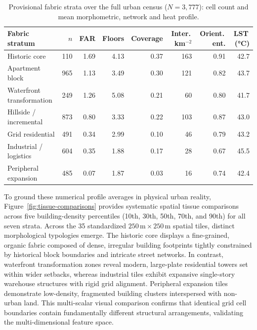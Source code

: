 \begin{table}[htbp]
  \centering\footnotesize
  \caption{Provisional fabric strata over the full urban census ($N=3{,}777$): cell
  count and mean morphometric, network and heat profile.}
  \label{tab:fabric-profiles}
  \begin{tabular}{@{}lrrrrrrr@{}}
    \toprule
    Fabric stratum & $n$ & FAR & Floors & Coverage & Inter.\,km$^{-2}$ & Orient.\,ent. & LST\,(\si{\celsius}) \\
    \midrule
    Historic core             & 110 & 1.69 & 4.13 & 0.37 & 163 & 0.91 & 42.7 \\
    Apartment block           & 965 & 1.13 & 3.49 & 0.30 & 121 & 0.82 & 43.7 \\
    Waterfront transformation & 249 & 1.26 & 5.08 & 0.21 &  60 & 0.80 & 41.7 \\
    Hillside / incremental    & 873 & 0.80 & 3.33 & 0.22 & 103 & 0.87 & 43.0 \\
    Grid residential          & 491 & 0.34 & 2.99 & 0.10 &  46 & 0.79 & 43.2 \\
    Industrial / logistics    & 604 & 0.35 & 1.88 & 0.17 &  28 & 0.67 & 45.5 \\
    Peripheral expansion      & 485 & 0.07 & 1.87 & 0.03 &  16 & 0.74 & 42.4 \\
    \bottomrule
  \end{tabular}
\end{table}

To ground these numerical profile averages in physical urban reality, Figure~\ref{fig:tissue-comparisons} provides systematic spatial tissue comparisons across five building-density percentiles (10th, 30th, 50th, 70th, and 90th) for all seven strata. Across the 35 standardized $250\,\text{m} \times 250\,\text{m}$ spatial tiles, distinct morphological typologies emerge. The historic core displays a fine-grained, organic fabric composed of dense, irregular building footprints tightly constrained by historical block boundaries and intricate street networks. In contrast, waterfront transformation zones reveal modern, large-plate residential towers set within wider setbacks, whereas industrial tiles exhibit expansive single-story warehouse structures with rigid grid alignment. Peripheral expansion tiles demonstrate low-density, fragmented building clusters interspersed with non-urban land. This multi-scalar visual comparison confirms that identical grid cell boundaries contain fundamentally different structural arrangements, validating the multi-dimensional feature space.

